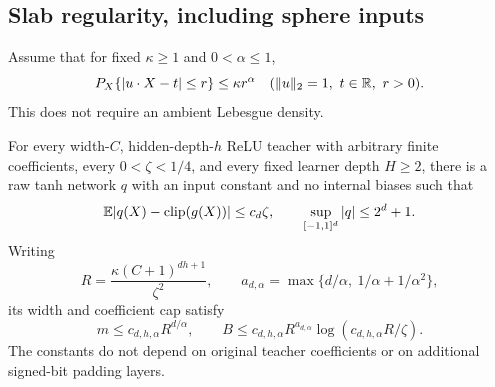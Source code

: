 \subsection{Slab regularity, including sphere inputs}
Assume that for fixed $\kappa\ge1$ and $0<\alpha\le1$,
\begin{equation}
 P_X\{|u\cdot X-t|\le r\}\le\kappa r^\alpha
 \quad(\|u\|_2=1,\ t\in\mathbb R,\ r>0).
 \label{eq:slab}
\end{equation}
This does not require an ambient Lebesgue density.

\begin{lemma}
\label{lem:slab-box}
For every width-$C$, hidden-depth-$h$ ReLU teacher with arbitrary finite
coefficients, every $0<\zeta<1/4$, and every fixed learner depth $H\ge2$,
there is a raw tanh network $q$ with an input constant and no internal
biases such that
\[
 \mathbb E|q(X)-\operatorname{clip}(g(X))|\le c_d\zeta,
 \qquad \sup_{[-1,1]^d}|q|\le2^d+1.
\]
Writing
\[
 R=\frac{\kappa(C+1)^{dh+1}}{\zeta^2},\qquad
 a_{d,\alpha}=\max\{d/\alpha,\ 1/\alpha+1/\alpha^2\},
\]
its width and coefficient cap satisfy
\[
 m\le c_{d,h,\alpha}R^{d/\alpha},\qquad
 B\le c_{d,h,\alpha}R^{a_{d,\alpha}}
                    \log(c_{d,h,\alpha}R/\zeta).
\]
The constants do not depend on original teacher coefficients or on
additional signed-bit padding layers.
\end{lemma}
